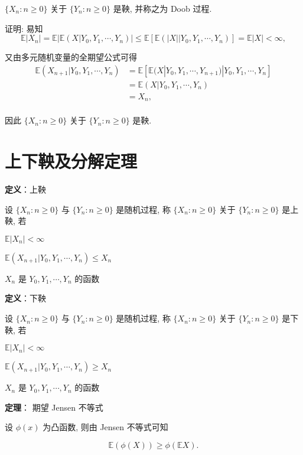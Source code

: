 \documentclass[openany]{ctexbook}
\theoremstyle{kaiti}
\theoremstyle{normal}
\begin{document}
$\{X_n:n\geqslant0\}$ 关于 $\{Y_n:n\geqslant0\}$ 是鞅, 并称之为 Doob 过程.

证明: 易知
\begin{equation}
  \mathbb{E}|X_n|=\mathbb{E}|\mathbb{E}(X\big|Y_0,Y_1,\cdots,Y_n)|\leqslant \mathbb{E}[\mathbb{E}(|X|\big|Y_0,Y_1,\cdots,Y_n)]=\mathbb{E}|X|<\infty,
\end{equation}

又由多元随机变量的全期望公式可得
\begin{equation}
  \begin{aligned}
    \mathbb{E}(X_{n+1}|Y_0,Y_1,\cdots,Y_n)
    &=\mathbb{E}[\mathbb{E}(X|Y_0,Y_1,\cdots,Y_{n+1})|Y_0,Y_1,\cdots,Y_n]\\
    &=\mathbb{E}(X|Y_0,Y_1,\cdots,Y_n)\\
    &=X_n,\\
  \end{aligned}
\end{equation}

因此 $\{X_n:n\geqslant0\}$ 关于 $\{Y_n:n\geqslant0\}$ 是鞅.

\section{上下鞅及分解定理}

\textbf{定义}：上鞅

设 $\{X_n:n\geqslant0\}$ 与 $\{Y_n:n\geqslant0\}$ 是随机过程, 称 $\{X_n:n\geqslant0\}$ 关于 $\{Y_n:n\geqslant0\}$ 是上鞅, 若 

$\mathbb{E}|X_n|<\infty$

$\mathbb{E}(X_{n+1}|Y_0,Y_1,\cdots,Y_n)\leqslant X_n$

$X_n$ 是 $Y_0,Y_1,\cdots,Y_n$ 的函数

\textbf{定义}：下鞅

设 $\{X_n:n\geqslant0\}$ 与 $\{Y_n:n\geqslant0\}$ 是随机过程, 称 $\{X_n:n\geqslant0\}$ 关于 $\{Y_n:n\geqslant0\}$ 是下鞅, 若 

$\mathbb{E}|X_n|<\infty$

$\mathbb{E}(X_{n+1}|Y_0,Y_1,\cdots,Y_n)\geqslant X_n$

$X_n$ 是 $Y_0,Y_1,\cdots,Y_n$ 的函数

\textbf{定理}： 期望 Jensen 不等式

设 $\phi(x)$ 为凸函数, 则由 Jensen 不等式可知

\begin{equation}
  \mathbb{E}(\phi(X))\geqslant\phi(\mathbb{E}X).
\end{equation}
\end{document}
